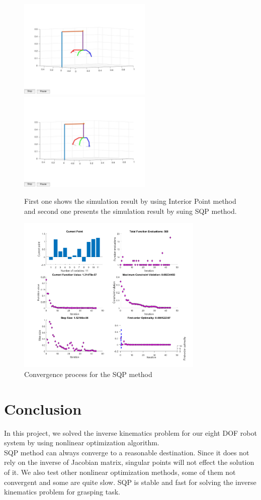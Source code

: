 \documentclass[journal,comsoc]{IEEEtran}
\begin{document}
\begin{figure}[!t]
\centering
\includegraphics[width=2.5in]{ip.jpg}
\includegraphics[width=2.5in]{sqp.jpg}
\caption{ First one shows the simulation result by using Interior Point method and second one presents the simulation result by suing SQP method. }
\label{fig_sim }
\end{figure}

\begin{figure}[!t]
\centering
\includegraphics[width=3.5in]{reult.png}
\caption{ Convergence process for the SQP method }
\label{fig_sim }
\end{figure}


\section{Conclusion}
In this project, we solved the inverse kinematics problem for our eight DOF robot system by using nonlinear optimization algorithm. \\
SQP method can always converge to a reasonable destination. Since it does not rely on the inverse of Jacobian matrix, singular points will not effect the solution of it. We also test other nonlinear optimization methods, some of them not convergent and some are quite slow. SQP is stable and fast for solving the inverse kinematics problem for grasping task.  \\
\end{document}
